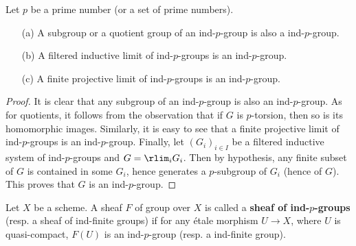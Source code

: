 \begin{proposition}\label{scheme etale topos ind p-group prop}
Let $p$ be a prime number (or a set of prime numbers).
\begin{enumerate}
    \item[(a)] A subgroup or a quotient group of an ind-$p$-group is also a ind-$p$-group.
    \item[(b)] A filtered inductive limit of ind-$p$-groups is an ind-$p$-group.
    \item[(c)] A finite projective limit of ind-$p$-groups is an ind-$p$-group.
\end{enumerate}
\end{proposition}
\begin{proof}
It is clear that any subgroup of an ind-$p$-group is also an ind-$p$-group. As for quotients, it follows from the observation that if $G$ is $p$-torsion, then so is its homomorphic images. Similarly, it is easy to see that a finite projective limit of ind-$p$-groups is an ind-$p$-group. Finally, let $(G_i)_{i\in I}$ be a filtered inductive system of ind-$p$-groups and $G=\rlim_iG_i$. Then by hypothesis, any finite subset of $G$ is contained in some $G_i$, hence generates a $p$-subgroup of $G_i$ (hence of $G$). This proves that $G$ is an ind-$p$-group.
\end{proof}

\begin{definition}
Let $X$ be a scheme. A sheaf $F$ of group over $X$ is called a \textbf{sheaf of ind-$p$-groups} (resp. a sheaf of ind-finite groups) if for any \'etale morphism $U\to X$, where $U$ is quasi-compact, $F(U)$ is an ind-$p$-group (resp. a ind-finite group).
\end{definition}

